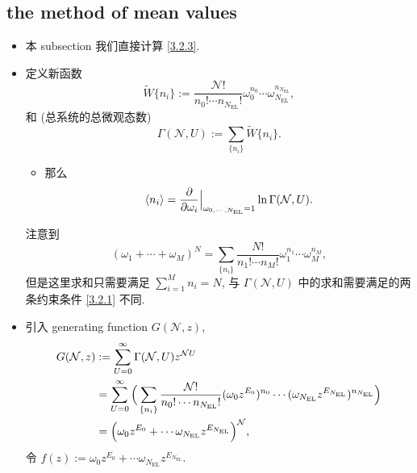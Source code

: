 \subsection{the method of mean values}
\begin{itemize}
	\item 本 subsection 我们直接计算 \eqref{3.2.3}.
	
	\item 定义新函数
	\begin{equation}
		\tilde{W}\{n_i\} := \frac{\mathcal{N}!}{n_0! \cdots n_{N_\text{EL}}!} \omega_0^{n_0} \cdots \omega_{N_\text{EL}}^{n_{N_\text{EL}}},
	\end{equation}
	和 (总系统的总微观态数)
	\begin{equation}
		\Gamma(\mathcal{N}, U) := \sum_{\{n_i\}} \tilde{W}\{n_i\}.
	\end{equation}
	\begin{itemize}
		\item 那么
		\begin{equation}
			\braket{n_i} = \frac{\partial}{\partial \omega_i} \Big|_{\omega_{0, \cdots, N_\text{EL}} = 1} \ln \Gamma(\mathcal{N}, U).
		\end{equation}
	\end{itemize}
	
	\begin{tcolorbox}[title=notice:]
		注意到
		\begin{equation}
			(\omega_1 + \cdots + \omega_M)^N = \sum_{\{n_i\}} \frac{N!}{n_1! \cdots n_M!} \omega_1^{n_1} \cdots \omega_M^{n_M},
		\end{equation}
		但是这里求和只需要满足 $\sum_{i = 1}^M n_i = N$, 与 $\Gamma(\mathcal{N}, U)$ 中的求和需要满足的两条约束条件 \eqref{3.2.1} 不同.
	\end{tcolorbox}
	
	\item 引入 generating function $G(\mathcal{N}, z)$,
	\begin{align}
		G(\mathcal{N}, z) &:= \sum_{U = 0}^\infty \Gamma(\mathcal{N}, U) z^{\mathcal{N} U} \notag \\
		&= \sum_{U = 0}^\infty \Big( \sum_{\{n_i\}} \frac{\mathcal{N}!}{n_0! \cdots n_{N_\text{EL}}!} (\omega_0 z^{E_0})^{n_0} \cdots (\omega_{N_\text{EL}} z^{E_{N_\text{EL}}})^{n_{N_\text{EL}}} \Big) \notag \\
		&= \Big( \omega_0 z^{E_0} + \cdots \omega_{N_\text{EL}} z^{E_{N_\text{EL}}} \Big)^{\mathcal{N}},
	\end{align}
	令 $f(z) := \omega_0 z^{E_0} + \cdots \omega_{N_\text{EL}} z^{E_{N_\text{EL}}}$.
	

\end{itemize}
